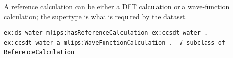 A reference calculation can be either a DFT calculation or a wave-function calculation; the supertype is what is required by the dataset.
\begin{lstlisting}[language=turtle]
ex:ds-water mlips:hasReferenceCalculation ex:ccsdt-water .
ex:ccsdt-water a mlips:WaveFunctionCalculation .  # subclass of ReferenceCalculation
\end{lstlisting}
